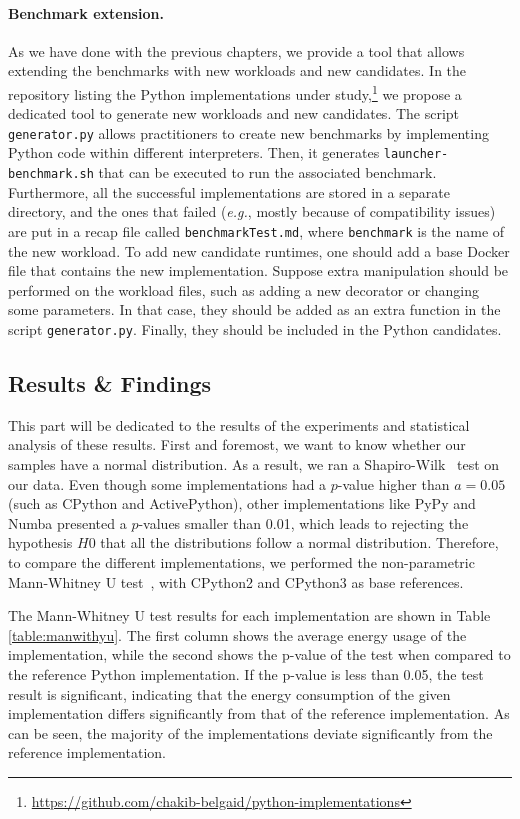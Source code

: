 \paragraph{Benchmark extension.}
As we have done with the previous chapters, we provide a tool that allows extending the benchmarks with new workloads and new candidates.
In the repository listing the Python implementations under study,\footnote{\url{https://github.com/chakib-belgaid/python-implementations}} we propose a dedicated tool to generate new workloads and new candidates.
The script \texttt{generator.py} allows practitioners to create new benchmarks by implementing Python code within different interpreters.
Then, it generates \texttt{launcher-benchmark.sh} that can be executed to run the associated benchmark.
Furthermore, all the successful implementations are stored in a separate directory, and the ones that failed (\emph{e.g.}, mostly because of compatibility issues) are put in a recap file called \texttt{benchmarkTest.md}, where \texttt{benchmark} is the name of the new workload.
To add new candidate runtimes, one should add a base Docker file that contains the new implementation. Suppose extra manipulation should be performed on the workload files, such as adding a new decorator or changing some parameters. In that case, they should be added as an extra function in the script \texttt{generator.py}.
Finally, they should be included in the Python candidates.

\subsection{Results \& Findings}
This part will be dedicated to the results of the experiments and statistical analysis of these results.
First and foremost, we want to know whether our samples have a normal distribution. As a result, we ran a Shapiro-Wilk~\cite{shapiro1968comparative} test on our data.
Even though some implementations had a $p$-value higher than $a=0.05$ (such as CPython and ActivePython), other implementations like PyPy and Numba presented a $p$-values smaller than 0.01, which leads to rejecting the hypothesis $H0$ that all the distributions follow a normal distribution.
Therefore, to compare the different implementations, we performed the non-parametric Mann-Whitney U test~\cite{zimmerman1987comparative}, with CPython2 and CPython3 as base references.

The Mann-Whitney U test results for each implementation are shown in Table \ref{table:manwithyu}. The first column shows the average energy usage of the implementation, while the second shows the p-value of the test when compared to the reference Python implementation. If the p-value is less than 0.05, the test result is significant, indicating that the energy consumption of the given implementation differs significantly from that of the reference implementation.
As can be seen, the majority of the implementations deviate significantly from the reference implementation.


